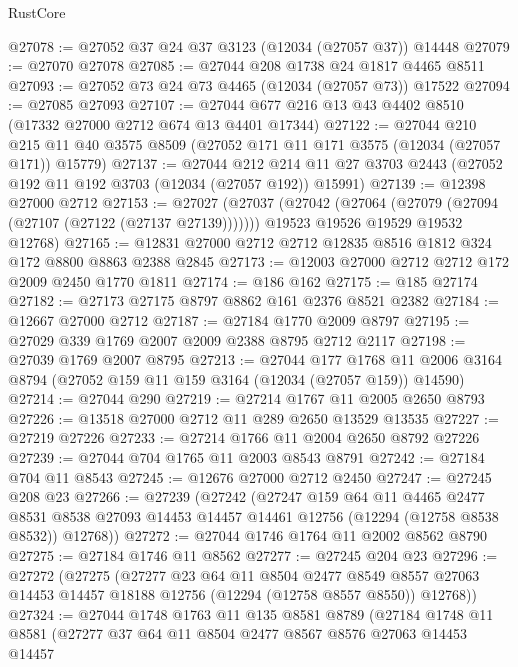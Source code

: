 \begin{lexlean}{RustCore}
\begin{coremodule}
@27078 := @27052 @37 @24 @37 @3123 (@12034 (@27057 @37)) @14448
@27079 := @27070 @27078
@27085 := @27044 @208 @1738 @24 @1817 @4465 @8511
@27093 := @27052 @73 @24 @73 @4465 (@12034 (@27057 @73)) @17522
@27094 := @27085 @27093
@27107 := @27044 @677 @216 @13 @43 @4402 @8510 (@17332 @27000 @2712 @674 @13 @4401 @17344)
@27122 := @27044
    @210
    @215
    @11
    @40
    @3575
    @8509
    (@27052 @171 @11 @171 @3575 (@12034 (@27057 @171)) @15779)
@27137 := @27044
    @212
    @214
    @11
    @27
    @3703
    @2443
    (@27052 @192 @11 @192 @3703 (@12034 (@27057 @192)) @15991)
@27139 := @12398 @27000 @2712
@27153 := @27027
    (@27037
      (@27042 (@27064 (@27079 (@27094 (@27107 (@27122 (@27137 @27139)))))))
      @19523
      @19526
      @19529
      @19532
      @12768)
@27165 := @12831 @27000 @2712 @2712 @12835 @8516 @1812 @324 @172 @8800 @8863 @2388 @2845
@27173 := @12003 @27000 @2712 @2712 @172 @2009 @2450 @1770 @1811
@27174 := @186 @162
@27175 := @185 @27174
@27182 := @27173 @27175 @8797 @8862 @161 @2376 @8521 @2382
@27184 := @12667 @27000 @2712
@27187 := @27184 @1770 @2009 @8797
@27195 := @27029 @339 @1769 @2007 @2009 @2388 @8795 @2712 @2117
@27198 := @27039 @1769 @2007 @8795
@27213 := @27044
    @177
    @1768
    @11
    @2006
    @3164
    @8794
    (@27052 @159 @11 @159 @3164 (@12034 (@27057 @159)) @14590)
@27214 := @27044 @290
@27219 := @27214 @1767 @11 @2005 @2650 @8793
@27226 := @13518 @27000 @2712 @11 @289 @2650 @13529 @13535
@27227 := @27219 @27226
@27233 := @27214 @1766 @11 @2004 @2650 @8792 @27226
@27239 := @27044 @704 @1765 @11 @2003 @8543 @8791
@27242 := @27184 @704 @11 @8543
@27245 := @12676 @27000 @2712 @2450
@27247 := @27245 @208 @23
@27266 := @27239
    (@27242
      (@27247
        @159
        @64
        @11
        @4465
        @2477
        @8531
        @8538
        @27093
        @14453
        @14457
        @14461
        @12756
        (@12294 (@12758 @8538 @8532))
        @12768))
@27272 := @27044 @1746 @1764 @11 @2002 @8562 @8790
@27275 := @27184 @1746 @11 @8562
@27277 := @27245 @204 @23
@27296 := @27272
    (@27275
      (@27277
        @23
        @64
        @11
        @8504
        @2477
        @8549
        @8557
        @27063
        @14453
        @14457
        @18188
        @12756
        (@12294 (@12758 @8557 @8550))
        @12768))
@27324 := @27044
    @1748
    @1763
    @11
    @135
    @8581
    @8789
    (@27184
      @1748
      @11
      @8581
      (@27277
        @37
        @64
        @11
        @8504
        @2477
        @8567
        @8576
        @27063
        @14453
        @14457

\end{coremodule}
\end{lexlean}

